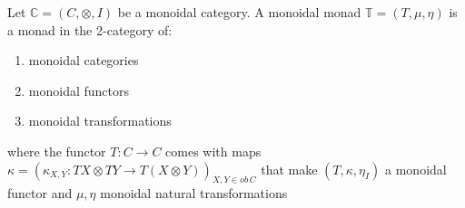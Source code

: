 \begin{definition}
\label{def:monoidal_monad}
    Let $\mathbb{C}=(C,\otimes,I)$ be a monoidal category.  A monoidal monad $\mathbb{T} = (T,\mu,\eta)$ is a monad in the 2-category of:
    \begin{enumerate}
        \item monoidal categories
        \item monoidal functors
        \item monoidal transformations
    \end{enumerate}
    where the functor $T:C \rightarrow C$ comes with maps $\kappa = (\kappa_{X,Y}: TX \otimes TY \rightarrow T(X \otimes Y))_{X,Y \in ob\, C}$
    that make $(T,\kappa,\eta_I)$ a monoidal functor and $\mu,\eta$ monoidal natural transformations \cite{seal2013}
\end{definition}
